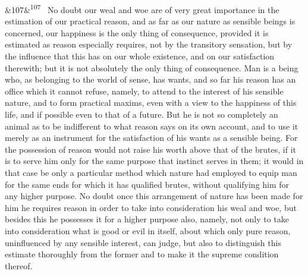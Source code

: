\documentclass[12pt]{article}
\newcommand{\para}[1][]{\par\noindent\ifx&#1&\else\textsuperscript{\footnotesize #1}~\fi}
\begin{document}
\para[107] No doubt our weal and woe are of very great importance in the estimation of our practical reason, and as far as our nature as sensible beings is concerned, our happiness is the only thing of consequence, provided it is estimated as reason especially requires, not by the transitory sensation, but by the influence that this has on our whole existence, and on our satisfaction therewith; but it is not absolutely the only thing of consequence. Man is a being who, as belonging to the world of sense, has wants, and so far his reason has an office which it cannot refuse, namely, to attend to the interest of his sensible nature, and to form practical maxims, even with a view to the happiness of this life, and if possible even to that of a future. But he is not so completely an animal as to be indifferent to what reason says on its own account, and to use it merely as an instrument for the satisfaction of his wants as a sensible being. For the possession of reason would not raise his worth above that of the brutes, if it is to serve him only for the same purpose that instinct serves in them; it would in that case be only a particular method which nature had employed to equip man for the same ends for which it has qualified brutes, without qualifying him for any higher purpose. No doubt once this arrangement of nature has been made for him he requires reason in order to take into consideration his weal and woe, but besides this he possesses it for a higher purpose also, namely, not only to take into consideration what is good or evil in itself, about which only pure reason, uninfluenced by any sensible interest, can judge, but also to distinguish this estimate thoroughly from the former and to make it the supreme condition thereof.
\end{document}
